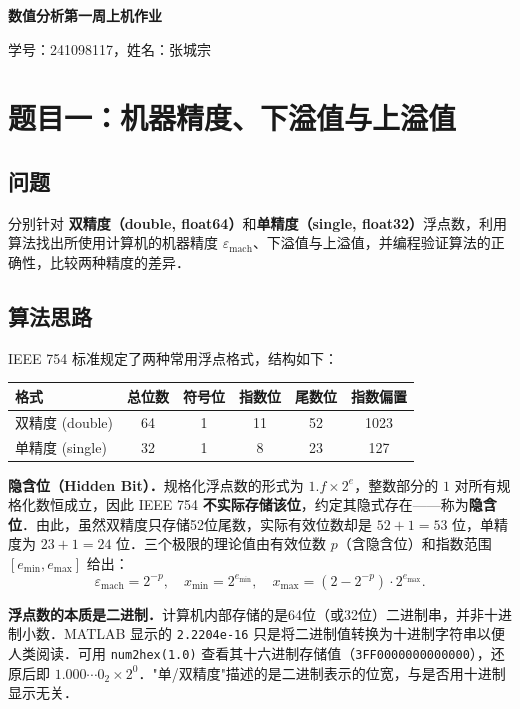 \documentclass[UTF8,a4paper,11pt]{article}
\begin{document}
\begin{center}
{\huge \textbf{数值分析第一周上机作业}}

\vspace{0.3cm}
{\large 学号：241098117\quad，姓名：张城宗\quad}
\end{center}

\section{题目一：机器精度、下溢值与上溢值}

\subsection{问题}

分别针对 \textbf{双精度（double, float64）}和\textbf{单精度（single, float32）}浮点数，利用算法找出所使用计算机的机器精度 $\varepsilon_{\mathrm{mach}}$、下溢值与上溢值，并编程验证算法的正确性，比较两种精度的差异．

\subsection{算法思路}

IEEE 754 标准规定了两种常用浮点格式，结构如下：

\begin{table}[H]
\centering
\begin{tabular}{lccccc}
\toprule
格式 & 总位数 & 符号位 & 指数位 & 尾数位 & 指数偏置 \\
\midrule
双精度 (double) & 64 & 1 & 11 & 52 & 1023 \\
单精度 (single) & 32 & 1 & 8  & 23 & 127  \\
\bottomrule
\end{tabular}
\end{table}

\noindent\textbf{隐含位（Hidden Bit）．}规格化浮点数的形式为 $1.f \times 2^e$，整数部分的 $1$ 对所有规格化数恒成立，因此 IEEE 754 \textbf{不实际存储该位}，约定其隐式存在——称为\textbf{隐含位}．由此，虽然双精度只存储52位尾数，实际有效位数却是 $52+1=53$ 位，单精度为 $23+1=24$ 位．三个极限的理论值由有效位数 $p$（含隐含位）和指数范围 $[e_{\min}, e_{\max}]$ 给出：
$$
\varepsilon_{\mathrm{mach}} = 2^{-p}, \quad
x_{\min} = 2^{e_{\min}}, \quad
x_{\max} = (2-2^{-p})\cdot 2^{e_{\max}}.
$$

\noindent\textbf{浮点数的本质是二进制．}计算机内部存储的是64位（或32位）二进制串，并非十进制小数．MATLAB 显示的 \texttt{2.2204e-16} 只是将二进制值转换为十进制字符串以便人类阅读．可用 \texttt{num2hex(1.0)} 查看其十六进制存储值（\texttt{3FF0000000000000}），还原后即 $1.000\cdots0_2 \times 2^0$．"单/双精度"描述的是二进制表示的位宽，与是否用十进制显示无关．
\end{document}
